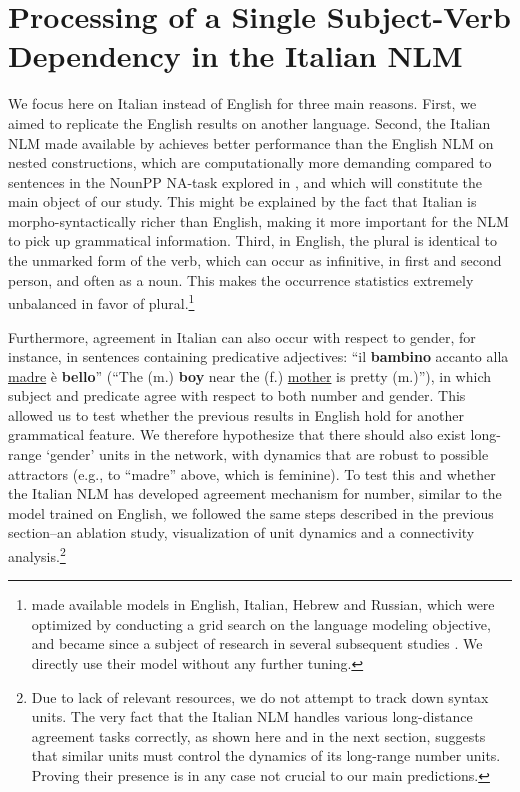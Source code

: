 \section{Processing of a Single Subject-Verb Dependency in the Italian NLM}\label{single_dependency_Italian}
We focus here on Italian instead of English for three main reasons. First, we aimed to replicate the English results on another language. Second, the Italian NLM made available by \citet{Gulordava:etal:2018} achieves better performance than the English NLM on nested constructions, which are computationally more demanding compared to sentences in the NounPP NA-task explored in \citet{lakretz2019emergence}, and which will constitute the main object of our study. This might be explained by the fact that Italian is morpho-syntactically richer than English, making it more important for the NLM to pick up grammatical information. Third, in English, the plural is identical to the unmarked form of the verb, which can occur as infinitive, in first and second person, and often as a noun. This makes the occurrence statistics extremely unbalanced in favor of plural.\footnote{\citet{Gulordava:etal:2018} made available models in English, Italian, Hebrew and Russian, which were optimized by conducting a grid search on the language modeling objective, and became since a subject of research in several subsequent studies \citep{Giulianelli:etal:2018, jumelet2019analysing, wilcox2018rnn, futrell2019neural}. We directly use their model without any further tuning.}

Furthermore, agreement in Italian can also occur with respect to gender, for instance, in sentences containing predicative adjectives: ``il \textbf{bambino} accanto alla \underline{madre} \`{e} \textbf{bello}'' (``The (m.) \textbf{boy} near the (f.) \underline{mother} is pretty (m.)''), in which subject and predicate agree with respect to both number and gender. This allowed us to test whether the previous results in English hold for another grammatical feature. We therefore hypothesize that there should also exist long-range `gender' units in the network, with dynamics that are robust to possible attractors (e.g., to ``madre'' above, which is feminine). To test this and whether the Italian NLM has developed agreement mechanism for number, similar to the model trained on English, we followed the same steps described in the previous section--an ablation study, visualization of unit dynamics and a connectivity analysis.\footnote{Due to lack of relevant resources, we do not attempt to track down syntax units. The very fact that the Italian NLM handles various long-distance agreement tasks correctly, as shown here and in the next section, suggests that similar units must control the dynamics of its long-range number units. Proving their presence is in any case not crucial to our main predictions.}


